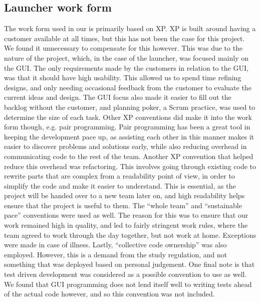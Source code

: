 \subsection{Launcher work form}
\label{launcher_work_form}
The work form used in our \localgroup{} is primarily based on XP. 
XP is built around having a customer available at all times, but this has not been the case for this project. 
We found it unnecessary to compensate for this however. 
This was due to the nature of the project, which, in the case of the launcher, was focused mainly on the GUI. 
The only requirements made by the customers in relation to the GUI, was that it should have high usability. 
This allowed us to spend time refining designs, and only needing occasional feedback from the customer to evaluate the current ideas and design. 
The GUI focus also made it easier to fill out the backlog without the customer, and planning poker, a Scrum practice, was used to determine the size of each task. \newline
Other XP conventions did make it into the work form though, e.g. pair programming. 
Pair programming has been a great tool in keeping the development pace up, as assisting each other in this manner makes it easier to discover problems and solutions early, while also reducing overhead in communicating code to the rest of the team. \newline
Another XP convention that helped reduce this overhead was refactoring. 
This involves going through existing code to rewrite parts that are complex from a readability point of view, in order to simplify the code and make it easier to understand. 
This is essential, as the project will be handed over to a new team later on, and high readability helps ensure that the project is useful to them. \newline
The \textquotedblleft{}whole team\textquotedblright{} and \textquotedblleft{}sustainable pace\textquotedblright{} conventions were used as well. 
The reason for this was to ensure that our work remained high in quality, and led to fairly stringent work rules, where the team agreed to work through the day together, but not work at home. 
Exceptions were made in case of illness. 
Lastly, \textquotedblleft{}collective code ownership\textquotedblright{} was also employed. 
However, this is a demand from the study regulation, and not something that was deployed based on personal judgement. \newline
One final note is that test driven development was considered as a possible convention to use as well. 
We found that GUI programming does not lend itself well to writing tests ahead of the actual code however, and so this convention was not included. 